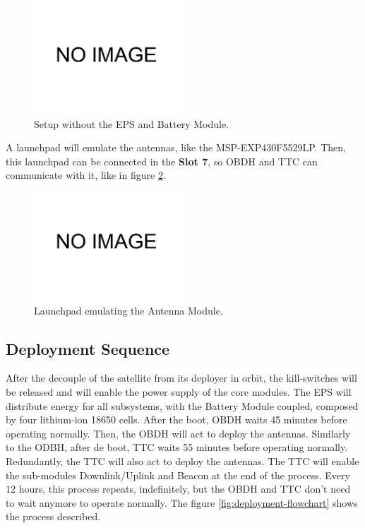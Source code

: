 \begin{figure}[H]
	\begin{center}
		\includegraphics[width=0.5\textwidth]{figures/dummy-image.png}
		\caption{Setup without the EPS and Battery Module.}
		\label{fig:connections-3}
	\end{center}
\end{figure}

A launchpad will emulate the antennas, like the MSP-EXP430F5529LP. Then, this launchpad can be connected in the \textbf{Slot 7}, so OBDH and TTC can communicate with it, like in figure \ref{fig:connections-4}.

\begin{figure}[H]
	\begin{center}
		\includegraphics[width=0.5\textwidth]{figures/dummy-image.png}
		\caption{Launchpad emulating the Antenna Module.}
		\label{fig:connections-4}
	\end{center}
\end{figure}

\subsection{Deployment Sequence}

After the decouple of the satellite from its deployer in orbit, the kill-switches will be released and will enable the power supply of the core modules. The EPS will distribute energy for all subsystems, with the Battery Module coupled, composed by four lithium-ion 18650 cells. After the boot, OBDH waits 45 minutes before operating normally. Then, the OBDH will act to deploy the antennas. Similarly to the ODBH, after de boot, TTC waits 55 minutes before operating normally. Redundantly, the TTC will also act to deploy the antennas. The TTC will enable the sub-modules Downlink/Uplink and Beacon at the end of the process. Every 12 hours, this process repeats, indefinitely, but the OBDH and TTC don’t need to wait anymore to operate normally. The figure \ref{fig:deployment-flowchart} shows the process described.

